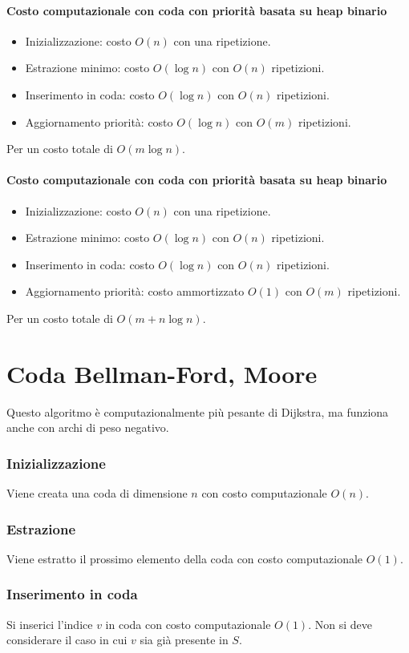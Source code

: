 \paragraph{Costo computazionale con coda con priorit\`a basata su heap binario}
\begin{itemize}
	\item Inizializzazione: costo $O(n)$ con una ripetizione.
	\item Estrazione minimo: costo $O(\log n)$ con $O(n)$ ripetizioni.
	\item Inserimento in coda: costo $O(\log n)$ con $O(n)$ ripetizioni.
	\item Aggiornamento priorit\`a: costo $O(\log n)$ con $O(m)$ ripetizioni.
\end{itemize}
Per un costo totale di $O(m\log n)$.
\paragraph{Costo computazionale con coda con priorit\`a basata su heap binario}
\begin{itemize}
	\item Inizializzazione: costo $O(n)$ con una ripetizione.
	\item Estrazione minimo: costo $O(\log n)$ con $O(n)$ ripetizioni.
	\item Inserimento in coda: costo $O(\log n)$ con $O(n)$ ripetizioni.
	\item Aggiornamento priorit\`a: costo ammortizzato $O(1)$ con $O(m)$ ripetizioni.
\end{itemize}
Per un costo totale di $O(m+n\log n)$.
\section{Coda Bellman-Ford, Moore}
Questo algoritmo \`e computazionalmente pi\`u pesante di Dijkstra, ma funziona anche con archi di peso negativo.
\subsubsection{Inizializzazione}
Viene creata una coda di dimensione $n$ con costo computazionale $O(n)$.
\subsubsection{Estrazione}
Viene estratto il prossimo elemento della coda con costo computazionale $O(1)$.
\subsubsection{Inserimento in coda}
Si inserici l'indice $v$ in coda con costo computazionale $O(1)$. Non si deve considerare il caso in cui $v$ sia gi\`a presente in $S$.

